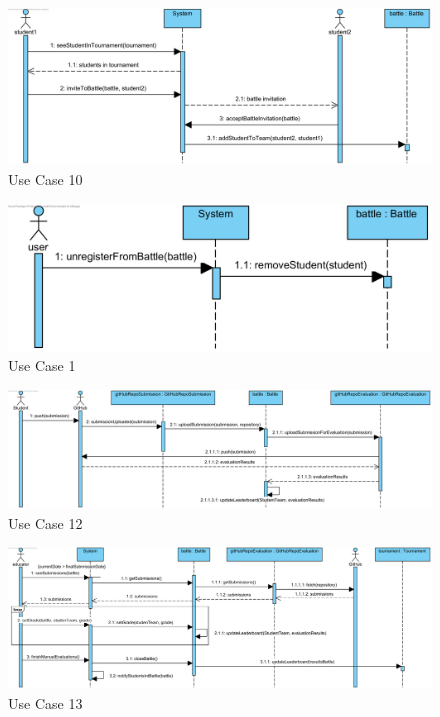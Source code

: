 \documentclass{article}
\begin{document}
\begin{figure}[H]
    \centering
    \includegraphics[width=1\textwidth]{images/UseCaseSequenceDiagrams/UC10}
    \caption{Use Case 10}
    \label{fig:UC10}
\end{figure}

\begin{figure}[H]
    \centering
    \includegraphics[width=1\textwidth]{images/UseCaseSequenceDiagrams/UC11}
    \caption{Use Case 1}
    \label{fig:UC11}
\end{figure}

\begin{figure}[H]
    \centering
    \includegraphics[width=1\textwidth]{images/UseCaseSequenceDiagrams/UC12}
    \caption{Use Case 12}
    \label{fig:UC12}
\end{figure}

\begin{figure}[H]
    \centering
    \includegraphics[width=1\textwidth]{images/UseCaseSequenceDiagrams/UC13}
    \caption{Use Case 13}
    \label{fig:UC13}
\end{figure}
\end{document}

